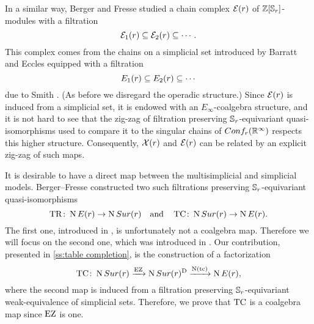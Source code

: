 In a similar way, Berger and Fresse \cite{berger2004combinatorial} studied a chain complex $\mathcal{E}(r)$ of $\mathbb{Z}[\mathbb{S}_r]$-modules with a filtration
\[
\mathcal{E}_{1}(r) \subseteq \mathcal{E}_{2}(r) \subseteq \dotsb \,.
\]
This complex comes from the chains on a simplicial set introduced by Barratt and Eccles \cite{barrat1974operad} equipped with a filtration
\[
E_{1}(r) \subseteq E_{2}(r) \subseteq \dotsb
\]
due to Smith \cite{smith1989filtration}.
(As before we disregard the operadic structure.)
Since $\mathcal{E}(r)$ is induced from a simplicial set, it is endowed with an $E_\infty$-coalgebra structure, and it is not hard to see that the zig-zag of filtration preserving $\mathbb{S}_r$-equivariant quasi-isomorphisms used to compare it to the singular chains of $Conf_{r}(\mathbb{R}^{\infty})$ respects this higher structure.
Consequently, $\mathcal{X}(r)$ and $\mathcal{E}(r)$ can be related by an explicit zig-zag of such maps.

It is desirable to have a direct map between the multisimplicial and simplicial models.
Berger--Fresse constructed two such filtrations preserving $\mathbb{S}_r$-equivariant quasi-isomorphisms
\[
\operatorname{TR} \colon \operatorname{N}E(r) \to \operatorname{N}Sur(r)
\quad \text{and} \quad
\operatorname{TC} \colon \operatorname{N}Sur(r) \to \operatorname{N} E(r).
\]
The first one, introduced in \cite[1$\cdot$3]{berger2004combinatorial}, is unfortunately not a coalgebra map.
Therefore we will focus on the second one, which was introduced in \cite{berger2002prismatic}.
Our contribution, presented in \cref{ss:table completion}, is the construction of a factorization
\[
\operatorname{TC} \colon \operatorname{N}Sur(r) \xrightarrow{\operatorname{EZ}} \operatorname{N}Sur(r)^{\mathrm{D}} \xrightarrow{\operatorname{N}(\operatorname{tc})} \operatorname{N} E(r),
\]
where the second map is induced from a filtration preserving $\mathbb{S}_r$-equivariant weak-equivalence of simplicial sets.
Therefore, we prove that $\operatorname{TC}$ is a coalgebra map since $\operatorname{EZ}$ is one.